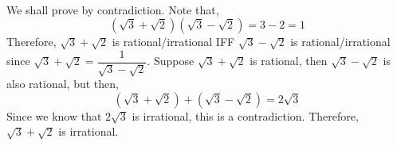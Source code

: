 \begin{pr}\leavevmode
    \\
    We shall prove by contradiction. Note that,
    \begin{equation*}
        (\sqrt{3} + \sqrt{2})(\sqrt{3} - \sqrt{2}) = 3 - 2 = 1
    \end{equation*}
    Therefore, $\sqrt{3} + \sqrt{2}$ is rational/irrational IFF $\sqrt{3} - \sqrt{2}$
    is rational/irrational since $\sqrt{3} + \sqrt{2} = \dfrac{1}{\sqrt{3} - \sqrt{2}}$.
    Suppose $\sqrt{3} + \sqrt{2}$ is rational, then $\sqrt{3} - \sqrt{2}$ is also rational,
    but then,
    \begin{equation*}
        (\sqrt{3} + \sqrt{2}) + (\sqrt{3} - \sqrt{2}) = 2\sqrt{3}
    \end{equation*}
    Since we know that $2\sqrt{3}$ is irrational, this is a contradiction.
    Therefore, $\sqrt{3} + \sqrt{2}$ is irrational.
\end{pr}

